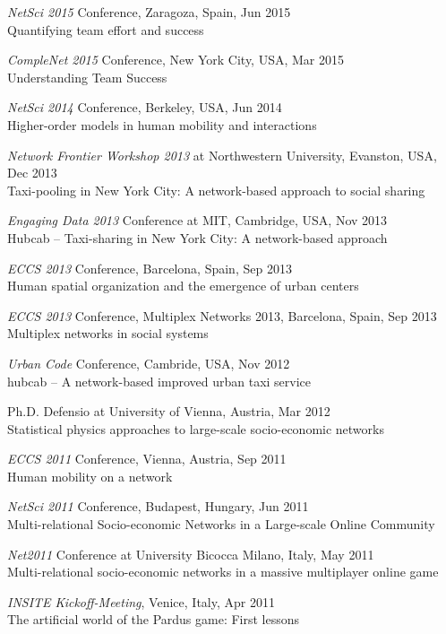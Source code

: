\documentclass[10pt,a4paper]{article}
\renewenvironment{itemize}{
  \begin{list}{}{
    \setlength{\leftmargin}{1.5em}
    \setlength{\itemsep}{0.25em}
    \setlength{\parskip}{0pt}
    \setlength{\parsep}{0.25em}
  }
}{
  \end{list}
}
\begin{document}
\begin{itemize}
\item{\emph{NetSci 2015} Conference, Zaragoza, Spain, Jun 2015\\Quantifying team effort and success}
\item{\emph{CompleNet 2015} Conference, New York City, USA, Mar 2015\\Understanding Team Success}
\item{\emph{NetSci 2014} Conference, Berkeley, USA, Jun 2014\\Higher-order models in human mobility and interactions}
\item{\emph{Network Frontier Workshop 2013} at Northwestern University, Evanston, USA, Dec 2013\\Taxi-pooling in New York City: A network-based approach to social sharing}
\item{\emph{Engaging Data 2013} Conference at MIT, Cambridge, USA, Nov 2013\\Hubcab -- Taxi-sharing in New York City: A network-based approach}
\item{\emph{ECCS 2013} Conference, Barcelona, Spain, Sep 2013\\Human spatial organization and the emergence of urban centers}
\item{\emph{ECCS 2013} Conference, Multiplex Networks 2013, Barcelona, Spain, Sep 2013\\Multiplex networks in social systems}
\item{\emph{Urban Code} Conference, Cambride, USA, Nov 2012\\hubcab -- A network-based improved urban taxi service}
\item{Ph.D. Defensio at University of Vienna, Austria, Mar 2012\\Statistical physics approaches to large-scale socio-economic networks}
\item{\emph{ECCS 2011} Conference, Vienna, Austria, Sep 2011\\Human mobility on a network}
\item{\emph{NetSci 2011} Conference, Budapest, Hungary, Jun 2011\\Multi-relational Socio-economic Networks in a Large-scale Online Community}
\item{\emph{Net2011} Conference at University Bicocca Milano, Italy, May 2011\\{Multi-relational socio-economic networks in a massive multiplayer online game}}
\item{\emph{INSITE Kickoff-Meeting}, Venice, Italy, Apr 2011\\{The artificial world of the Pardus game: First lessons}}

\end{itemize}
\end{document}
